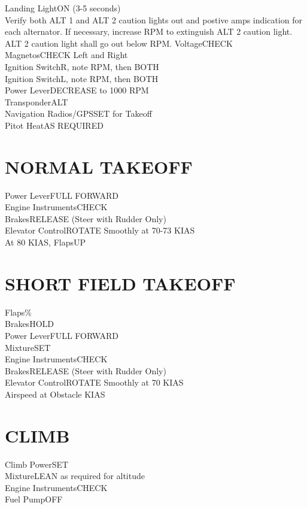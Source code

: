 \documentclass{article}
\begin{document}
\begin{multicols*}{2}
\hspace*{6mm} Landing Light\dotfill ON (3-5 seconds)\\
\hspace*{6mm} Verify both ALT 1 and ALT 2 caution lights out and postive amps indication for each alternator. If necessary, increase RPM to extinguish ALT 2 caution light. ALT 2 caution light shall go out below RPM.
Voltage\dotfill CHECK\\
Magnetos\dotfill CHECK Left and Right\\
\hspace*{6mm} Ignition Switch\dotfill R, note RPM, then BOTH\\
\hspace*{6mm} Ignition Switch\dotfill L, note RPM, then BOTH\\
Power Lever\dotfill DECREASE to 1000 RPM\\
Transponder\dotfill ALT\\
Navigation Radios/GPS\dotfill SET for Takeoff\\
Pitot Heat\dotfill AS REQUIRED
\section*{NORMAL TAKEOFF}
Power Lever\dotfill FULL FORWARD\\
Engine Instruments\dotfill CHECK\\
Brakes\dotfill RELEASE (Steer with Rudder Only)\\
Elevator Control\dotfill ROTATE Smoothly at 70-73 KIAS\\
At 80 KIAS, Flaps\dotfill UP
\section*{SHORT FIELD TAKEOFF}
Flaps\%\\
Brakes\dotfill HOLD\\
Power Lever\dotfill FULL FORWARD\\
Mixture\dotfill SET\\
Engine Instruments\dotfill CHECK\\
Brakes\dotfill RELEASE (Steer with Rudder Only)\\
Elevator Control\dotfill ROTATE Smoothly at 70 KIAS\\
Airspeed at Obstacle KIAS
\section*{CLIMB}
Climb Power\dotfill SET\\
Mixture\dotfill LEAN as required for altitude\\
Engine Instruments\dotfill CHECK\\
Fuel Pump\dotfill OFF

\end{multicols*}
\end{document}
